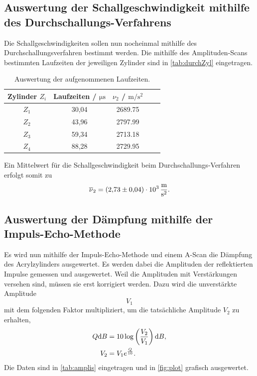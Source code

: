 \subsection{Auswertung der Schallgeschwindigkeit mithilfe des Durchschallungs-Verfahrens}
\label{subsec:schallDurch}

Die Schallgeschwindigkeiten sollen nun nocheinmal mithilfe des Durchschallungsverfahren bestimmt werden.
Die mithilfe des Amplituden-Scans bestimmten Laufzeiten der jeweiligen Zylinder sind in \autoref{tab:durchZyl} eingetragen.

\begin{table}
  \centering
  \caption{Auswertung der aufgenommenen Laufzeiten.}
  \label{tab:durchZyl}
  \begin{tabular}{c c c c c}
    \toprule
    Zylinder $Z_i$ &  Laufzeiten / $\si{\micro\second}$ & $\nu_2$ / $\si{\meter\per\second\squared} $\\
    \midrule
    $Z_1$ & 30,04 & 2689.75 \\
    $Z_2$ & 43,96 & 2797.99 \\
    $Z_3$ & 59,34 & 2713.18 \\
    $Z_4$ & 88,28 & 2729.95 \\
    \bottomrule
  \end{tabular}
\end{table}

Ein Mittelwert für die Schallgeschwindigkeit beim Durchschallungs-Verfahren erfolgt somit zu
\begin{align*}
  \overline \nu_2 = \SI{2,73 \pm 0,04 e3}{\meter\per\second\squared}.
\end{align*}

\subsection{Auswertung der Dämpfung mithilfe der Impuls-Echo-Methode}
\label{subsec:daempfung}

Es wird nun mithilfe der Impuls-Echo-Methode und einem A-Scan die Dämpfung des Acrylzylinders ausgewertet.
Es werden dabei die Amplituden der reflektierten Impulse gemessen und ausgewertet.
Weil die Amplituden mit Verstärkungen versehen sind, müssen sie erst korrigiert werden. Dazu wird die unverstärkte Amplitude $$V_1$$
mit dem folgenden Faktor multipliziert, um die tatsächliche Amplitude $V_2$ zu erhalten,
\begin{align*}
  Q \text dB &= 10\log\left(\frac{V_2}{V_1}\right) \text dB,\\
  V_2 &= V_1e^{\frac{Q}{10} }.
\end{align*}
Die Daten sind in \autoref{tab:amplis} eingetragen und in \autoref{fig:plot} grafisch ausgewertet.

